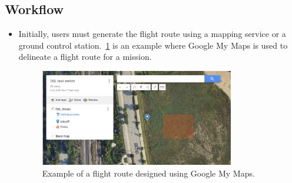 \subsection{Workflow}
\begin{itemize}
    \item Initially, users must generate the flight route using a mapping service or a ground control station.~\ref{fig:flight_route} is an example where Google My Maps is used to delineate a flight route for a mission.
    
    \begin{figure}[H] %
        \centering %
        \includegraphics[width=0.8\textwidth]{Pictures/pre_qgc.PNG}
        \caption{Example of a flight route designed using Google My Maps.}
        \label{fig:flight_route}
    \end{figure}
    

\end{itemize}
